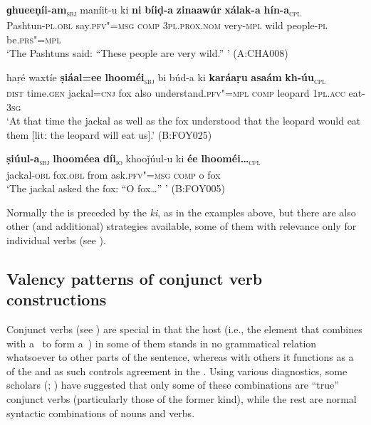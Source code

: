 \ea
\label{ex:12-72}
\gll {\ob}\textbf{ɡhueeṇíi-am}{\cb}\textsubscript{\textsc{\upshape sbj}} maníit-u ki {\ob}\textbf{ni} \textbf{bíiḍ-a} \textbf{zinaawúr} \textbf{xálak-a} \textbf{hín-a}{\cb}\textsubscript{\textsc{\upshape cpl}}\\
Pashtun-\textsc{pl.obl} say.\textsc{pfv"=msg} \textsc{c}\textsc{om}\textsc{p} \textsc{3pl.prox.nom} very-\textsc{mpl} wild people-\textsc{pl} be.\textsc{prs"=mpl}\\
\glt `The Pashtuns said: ``These people are very wild.'' ' (A:CHA008)
\z

\ea
\label{ex:12-73}
\gll haṛé waxtíe {\ob}\textbf{ṣiáal=ee} \textbf{lhooméi}{\cb}\textsubscript{\textsc{\upshape sbj}} bi búd-a ki {\ob}\textbf{karáaṛu} \textbf{asaám} \textbf{kh-úu}{\cb}\textsubscript{\textsc{\upshape cpl}}\\
\textsc{dist} time.\textsc{gen} jackal=\textsc{cnj} fox also understand.\textsc{pfv"=mpl} \textsc{comp} leopard \textsc{1pl.acc} eat-\textsc{3sg}\\
\glt `At that time the jackal as well as the fox understood that the leopard would eat them [lit: the leopard will eat us].' (B:FOY025)
\z

\begin{exe}
\ex
\label{ex:12-74}
\gll {\ob}\textbf{ṣiúul-a}{\cb}\textsubscript{\textsc{\upshape sbj}} {\ob}\textbf{lhooméea} \textbf{díi}{\cb}\textsubscript{\textsc{io}} khooǰúul-u ki {\ob}\textbf{ée} \textbf{lhooméi{\ldots}}{\cb}\textsubscript{\textsc{\upshape cpl}} \\
jackal-\textsc{obl} fox.\textsc{obl} from ask.\textsc{pfv"=msg} \textsc{comp} o fox \\
\glt `The jackal asked the fox: ``O fox{\ldots}'' ' (B:FOY005)
\end{exe}

Normally the  is preceded by the  \textit{ki}, as in the examples above, but there are also other (and additional) strategies available, some of them with relevance only for individual  verbs (see ). 


\subsection{Valency patterns of {conjunct verb} constructions}
\label{subsec:12-2-8}

Conjunct verbs (see ) are special in that the host (i.e., the element that combines with a~ to form a~) in some of them stands in no grammatical relation whatsoever to other parts of the sentence, whereas with others it functions as a~ of the  and as such controls agreement in the . Using various diagnostics, some scholars (\citealt[201]{verma1993}; \citealt[165]{mohanan1993}) have suggested that only some of these combinations are ``true'' conjunct verbs (particularly those of the former kind), while the rest are normal syntactic combinations of nouns and verbs. 



